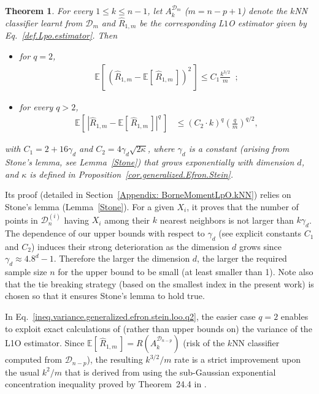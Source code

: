 \documentclass[twoside,11pt]{article}
\numberwithin{equation}{section}
\newcommand{\1}{\mathds{1}}%
\newcommand{\paren}[1]{\left( #1 \right)}
\newcommand{\croch}[1]{\left[\, #1 \,\right]}
\newcommand{\abs}[1]{\left\lvert #1 \right\rvert} %
\newcommand{\E}{\mathbb{E}}
\newcommand{\Rh}{\widehat{R}}
\newcommand{\D}{\mathcal{D}}
\numberwithin{equation}{section}
\theoremstyle{plain}
\newtheorem{thm}{Theorem}[section]
\begin{document}
\begin{thm}\label{prop.moment.upper.bounds.Loo} For every $1\leq k\leq n-1$, let $A_k^{\D_m}$ ($m=n-p+1$) denote the $k$NN classifier learnt from $\D_m$ and $\Rh_{1,m} $ be the corresponding L$1$O estimator given by Eq.~\eqref{def.Lpo.estimator}.
%
Then %
\begin{itemize}
    \item for $q=2$,
    \begin{eqnarray}\label{ineq.variance.generalized.efron.stein.loo.q2}
    \E\croch{ \paren{\Rh_{1,m} - \E\croch{\Rh_{1,m}} }^2}  \leq C_1   \frac{ k^{3/2}}{m} \enspace ;
    \end{eqnarray}
    \item for every $q>2$,
    \begin{eqnarray}\label{ineq.variance.generalized.efron.stein.loo.qlarger2}
    \E\croch{ \abs{ \Rh_{1,m} - \E\croch{ \Rh_{1,m} } }^{q} }
    & \leq   (C_2 \cdot k )^{q} \paren{ \frac{q}{m} }^{q/2}   ,
    \end{eqnarray}
\end{itemize}
with $C_1 =  2+16\gamma_d $ and $C_2 = 4\gamma_d\sqrt{2\kappa}$, where $\gamma_d$ is a constant (arising from Stone's lemma, see Lemma~\ref{Stone}) that grows exponentially with dimension $d$, and $\kappa$ is defined in Proposition~\ref{cor.generalized.Efron.Stein}.
\end{thm}
%
Its proof (detailed in Section~\ref{Appendix: BorneMomentLpO.kNN}) relies on Stone's lemma (Lemma~\ref{Stone}). For a given $X_i$, it proves that the number of points in $\D_n^{ (i) }$ having $X_i$ among their $k$ nearest neighbors is not larger than $k\gamma_d$.
%
The dependence of our upper bounds with respect to $\gamma_d$ (see explicit constants $C_1$ and $C_2$) induces their strong deterioration as the dimension $d$ grows since $\gamma_d \approx 4.8^d-1$. Therefore the larger the dimension $d$, the larger the required sample size $n$ for the upper bound to be small (at least smaller than 1).
%
Note also that the tie breaking strategy (based on the smallest index in the present work) is chosen so that it ensures Stone's lemma to hold true.
%

In Eq.~\eqref{ineq.variance.generalized.efron.stein.loo.q2}, the easier case $q=2$  enables to exploit exact calculations of (rather than upper bounds on) the variance of the L1O estimator.
%
Since $\E\croch{ \Rh_{1,m} }= R\paren{ A_k^{\D_{n-p}}}$ (risk of the $k$NN classifier computed from $\D_{n-p}$), the resulting $k^{3/2}/m$ rate is a strict improvement upon the usual $k^2/m$ that is derived from using the sub-Gaussian exponential concentration inequality proved by Theorem~24.4 in \cite{DeGyLu_1996}.
%
\end{document}
